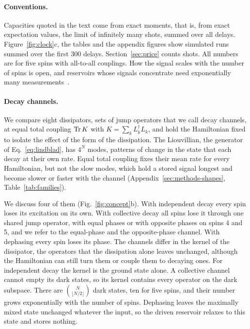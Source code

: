 \paragraph{Conventions.}
Capacities quoted in the text come from exact moments, that is, from exact expectation values, the limit of
infinitely many shots, summed over all delays. Figure~\ref{fig:clock}c, the tables and the appendix figures show
simulated runs summed over the first 300 delays. Section~\ref{sec:price} counts shots. All numbers are for five spins with
all-to-all couplings. How the signal scales with the number of spins is open, and reservoirs whose signals
concentrate need exponentially many measurements~\cite{Sannia2025Concentration}.

\paragraph{Decay channels.}
We compare eight dissipators, sets of jump operators that we call decay channels, at equal total coupling $\operatorname{Tr} K$
with $K=\sum_kL_k^\dagger L_k$, and hold the Hamiltonian fixed to isolate the effect of the form of the dissipation.
The Liouvillian, the generator of Eq.~\eqref{eq:lindblad}, has $4^N$ modes, patterns of change in the state that each
decay at their own rate. Equal total coupling fixes their mean rate for every Hamiltonian, but not the slow modes,
which hold a stored signal longest and become slower or faster with the channel
(Appendix~\ref{sec:methods-shapes}, Table~\ref{tab:families}).

We discuss four of them (Fig.~\ref{fig:concept}b). With independent decay every spin loses its excitation on its own.
With collective decay all spins lose it through one shared jump operator, with equal phases or with opposite phases on
spins 4 and 5, and we refer to the equal-phase and the opposite-phase channel. With dephasing every spin loses its
phase. The channels differ in the kernel of the dissipator, the operators that the dissipation alone leaves
unchanged, although the Hamiltonian can still turn them or couple them to decaying ones. For independent decay the
kernel is the ground state alone. A collective channel cannot empty its dark states, so its kernel contains every
operator on the dark subspace. There are $\binom{N}{\lfloor N/2\rfloor}$ dark states, ten for five spins, and their
number grows exponentially with the number of spins. Dephasing leaves the maximally mixed state unchanged whatever
the input, so the driven reservoir relaxes to this state and stores nothing.

